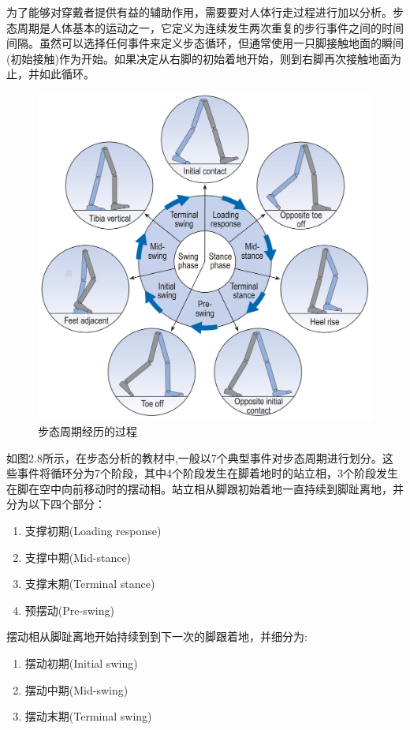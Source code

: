 为了能够对穿戴者提供有益的辅助作用，需要要对人体行走过程进行加以分析。步态周期是人体基本的运动之一，它定义为连续发生两次重复的步行事件之间的时间间隔。虽然可以选择任何事件来定义步态循环，但通常使用一只脚接触地面的瞬间(初始接触)作为开始。如果决定从右脚的初始着地开始，则到右脚再次接触地面为止，并如此循环。
\begin{figure}[htb]
    \includegraphics[width=14cm]{fig/f29.jpg}
    \caption{步态周期经历的过程\cite{p44}}
    \label{fig:mark}
\end{figure}

如图2.8所示，在步态分析的教材\cite{p44}中,一般以7个典型事件对步态周期进行划分。这些事件将循环分为7个阶段，其中4个阶段发生在脚着地时的站立相，3个阶段发生在脚在空中向前移动时的摆动相。站立相从脚跟初始着地一直持续到脚趾离地，并分为以下四个部分：
\begin{enumerate}
    \item 支撑初期(Loading response)
    \item 支撑中期(Mid-stance)
    \item 支撑末期(Terminal stance)
    \item 预摆动(Pre-swing)
\end{enumerate}

摆动相从脚趾离地开始持续到到下一次的脚跟着地，并细分为:
\begin{enumerate}
    \item 摆动初期(Initial swing)
    \item 摆动中期(Mid-swing)
    \item 摆动末期(Terminal swing)
\end{enumerate}

